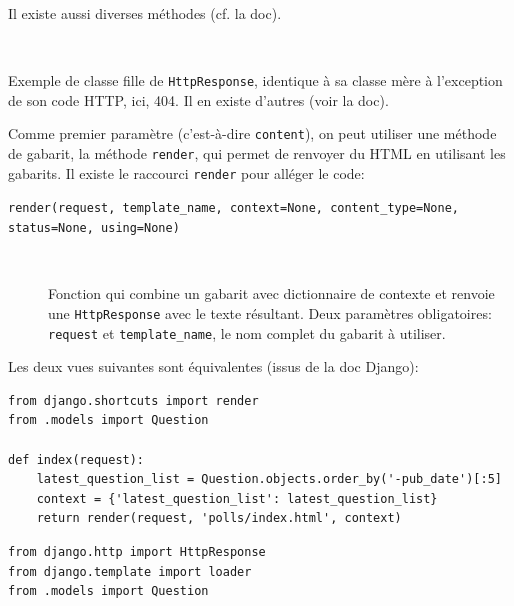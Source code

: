 \documentclass[a4paper, 10pt]{article}
\begin{document}
{\begin{description}
	      Il existe aussi diverses méthodes (cf. la doc).

	\item[\texttt{class HttpResponseNotFound(HttpResponse)}]~

	      Exemple de classe fille de \texttt{HttpResponse}, identique à sa classe mère à l'exception de son code HTTP, ici, 404. Il en existe d'autres (voir la doc).
\end{description}

Comme  premier paramètre (c'est-à-dire \texttt{content}), on peut utiliser une méthode de gabarit, la méthode \texttt{render}, qui permet de renvoyer du HTML en utilisant les gabarits. Il existe le raccourci \texttt{render} pour alléger le code:

\begin{description}
	\item[\texttt{render(request, template_name, context=None, content_type=None, status=None, using=None)}]~

	      Fonction qui combine un gabarit avec dictionnaire de contexte et renvoie une \texttt{HttpResponse} avec le texte résultant. Deux paramètres obligatoires: \texttt{request} et \texttt{template\_name}, le nom complet du gabarit à utiliser.
\end{description}

Les deux vues suivantes sont équivalentes (issus de la doc
Django):
\begin{verbatim}
from django.shortcuts import render
from .models import Question

def index(request):
    latest_question_list = Question.objects.order_by('-pub_date')[:5]
    context = {'latest_question_list': latest_question_list}
    return render(request, 'polls/index.html', context)
\end{verbatim}

\begin{verbatim}
from django.http import HttpResponse
from django.template import loader
from .models import Question


\end{verbatim}}
\end{document}
